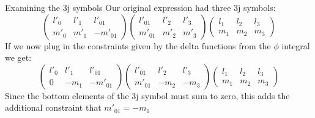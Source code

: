 \documentclass{beamer}
\begin{document}
    \begin{frame}{Examining the 3j symbols}
        Our original expression had three 3j symbols:
        \begin{equation*}
            \begin{pmatrix}
                l'_0 & l'_1 & l'_{01}\\
                m'_0 & m'_1 & -m'_{01}
            \end{pmatrix}
            \begin{pmatrix}
                l'_{01} & l'_2 & l'_{3}\\
                m'_{01} & m'_2 & m'_{3}
            \end{pmatrix}
            \begin{pmatrix}
                l_{1} & l_2 & l_{3}\\
                m_{1} & m_2 & m_{3}
            \end{pmatrix}
        \end{equation*}
        If we now plug in the constraints given by the delta functions from the $\phi$ integral we get:
        \begin{equation*}
            \begin{pmatrix}
                l'_0 & l'_1 & l'_{01}\\
                0 & -m_1 & -m'_{01}
            \end{pmatrix}
            \begin{pmatrix}
                l'_{01} & l'_2 & l'_{3}\\
                m'_{01} & -m_2 & -m_{3}
            \end{pmatrix}
            \begin{pmatrix}
                l_{1} & l_2 & l_{3}\\
                m_{1} & m_2 & m_{3}
            \end{pmatrix}
        \end{equation*}
        Since the bottom elements of the 3j symbol must sum to zero, this adds the additional constraint that $m'_{01}=-m_1$
    \end{frame}
\end{document}
